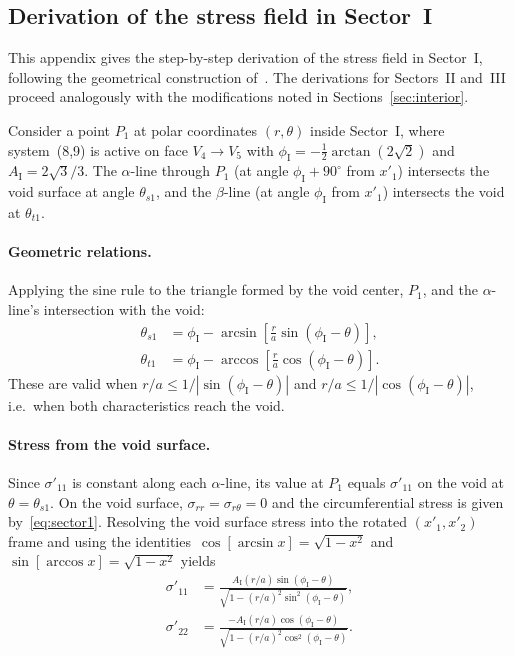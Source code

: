 \documentclass{svjour3} %
\newcommand{\srr}{\sigma_{rr}}
\newcommand{\srt}{\sigma_{r\theta}}
\begin{document}
\begin{appendices}

\section{Derivation of the stress field in Sector~I}
\label{app:sector_I}

This appendix gives the step-by-step derivation of the stress field
in Sector~I, following the geometrical construction
of~\citet{kysar2005}. The derivations for Sectors~II and~III proceed
analogously with the modifications noted in
Sections~\ref{sec:interior}.

Consider a point $P_1$ at polar coordinates $(r, \theta)$ inside
Sector~I, where system~(8,9) is active on face $V_4 \to V_5$ with
$\phi_{\mathrm{I}} = -\frac{1}{2}\arctan(2\sqrt{2})$ and
$A_{\mathrm{I}} = 2\sqrt{3}/3$. The $\alpha$-line through $P_1$
(at angle $\phi_{\mathrm{I}} + 90^\circ$ from $x'_1$) intersects the
void surface at angle $\theta_{s1}$, and the $\beta$-line (at angle
$\phi_{\mathrm{I}}$ from $x'_1$) intersects the void at
$\theta_{t1}$.

\paragraph{Geometric relations.}
Applying the sine rule to the triangle formed by the void center,
$P_1$, and the $\alpha$-line's intersection with the void:
\begin{align}
\label{eq:app_theta_s1}
\theta_{s1} &= \phi_{\mathrm{I}}
  - \arcsin\!\left[\frac{r}{a}\sin(\phi_{\mathrm{I}} - \theta)\right], \\
\label{eq:app_theta_t1}
\theta_{t1} &= \phi_{\mathrm{I}}
  - \arccos\!\left[\frac{r}{a}\cos(\phi_{\mathrm{I}} - \theta)\right].
\end{align}
These are valid when $r/a \leq 1/|\sin(\phi_{\mathrm{I}} - \theta)|$
and $r/a \leq 1/|\cos(\phi_{\mathrm{I}} - \theta)|$, i.e.\ when both
characteristics reach the void.

\paragraph{Stress from the void surface.}
Since $\sigma'_{11}$ is constant along each $\alpha$-line, its value
at $P_1$ equals $\sigma'_{11}$ on the void at $\theta = \theta_{s1}$.
On the void surface, $\srr = \srt = 0$ and the circumferential stress
is given by~\eqref{eq:sector1}. Resolving the void surface stress into
the rotated $(x'_1, x'_2)$ frame and using the
identities~$\cos[\arcsin x] = \sqrt{1-x^2}$ and
$\sin[\arccos x] = \sqrt{1-x^2}$ yields
\begin{align}
\sigma'_{11} &= \frac{A_{\mathrm{I}}(r/a)\sin(\phi_{\mathrm{I}} - \theta)}
  {\sqrt{1 - (r/a)^2\sin^2(\phi_{\mathrm{I}} - \theta)}}, \\
\sigma'_{22} &= \frac{-A_{\mathrm{I}}(r/a)\cos(\phi_{\mathrm{I}} - \theta)}
  {\sqrt{1 - (r/a)^2\cos^2(\phi_{\mathrm{I}} - \theta)}}.
\end{align}


\end{appendices}
\end{document}

